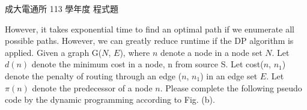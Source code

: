 \begin{pastexam}[label={px:ncku-113-cce-19}]{成大電通所 113 學年度 程式題}
\begin{enumerate}[label=\alph*.]
However, it takes exponential time to find an optimal path if we enumerate all possible paths.
However, we can greatly reduce runtime if the DP algorithm is applied. Given a graph G($N$, $E$),
where $n$ denote a node in a node set $N$. Let $d(n)$ denote the minimum cost in a node, n from
source S. Let cost($n$, $n_1$) denote the penalty of routing through an edge ($n$, $n_1$) in an
edge set $E$. Let $\pi(n)$ denote the predecessor of a node $n$. Please complete the following
pseudo code by the dynamic programming according to Fig. (b).

\begin{center}
\small
{}
\end{center}
\end{enumerate}
\end{pastexam}

